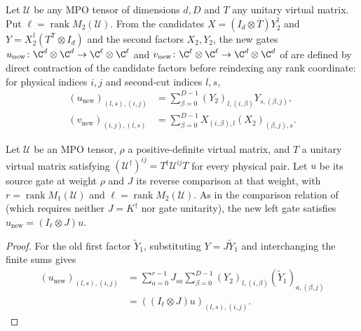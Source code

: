 \begin{definition}
    \label{def:mpug_inverse_compatible_gates}
    \leanok
    Let $\mathcal U$ be any MPO tensor of dimensions $d,D$ and $T$ any
    unitary virtual matrix. Put $\ell=\operatorname{rank}M_2(\mathcal U)$.
    From the candidates $X=(I_d\otimes\overline T)Y_2^\dagger$ and
    $Y=X_2^\dagger(T^{\mathsf T}\otimes I_d)$ and the second factors
    $X_2,Y_2$, the new gates
    $u_{\mathrm{new}}\colon\C^d\otimes\C^d\to\C^\ell\otimes\C^\ell$
    and $v_{\mathrm{new}}\colon\C^\ell\otimes\C^\ell\to\C^d\otimes\C^d$
    of \cite[lines~5486--5487]{FrancoRubio2025MPUGauging} are defined by direct
    contraction of the candidate factors before reindexing any rank coordinate:
    for physical indices $i,j$ and second-cut indices $l,s$,
    \begin{align}
        (u_{\mathrm{new}})_{(l,s),(i,j)}
         & =\sum_{\beta=0}^{D-1}(Y_2)_{l,(i,\beta)}Y_{s,(\beta,j)}, \\
        (v_{\mathrm{new}})_{(i,j),(l,s)}
         & =\sum_{\beta=0}^{D-1}X_{(i,\beta),l}(X_2)_{(\beta,j),s}.
    \end{align}
\end{definition}

\begin{lemma}
    \label{thm:mpug_inverse_new_u_transport}
    \leanok
    Let $\mathcal U$ be an MPO tensor, $\rho$ a positive-definite virtual
    matrix, and $T$ a unitary virtual matrix satisfying
    $(\mathcal U^\dagger)^{ij}=T^\dagger\mathcal U^{ij}T$ for every
    physical pair. Let $u$ be its source gate at weight $\rho$ and $J$
    its reverse comparison at that weight, with
    $r=\operatorname{rank}M_1(\mathcal U)$ and
    $\ell=\operatorname{rank}M_2(\mathcal U)$. As in the comparison relation of
    \cite[lines~5432--5443 and 5486--5487]{FrancoRubio2025MPUGauging} (which
    requires neither $J=K^\dagger$ nor gate unitarity), the new left gate
    satisfies
    $u_{\mathrm{new}}=(I_\ell\otimes J)u$.
\end{lemma}
\begin{proof}\leanok
    For the old first factor $\widetilde Y_1$, substituting
    $Y=J\widetilde Y_1$ and interchanging the finite sums gives
    \begin{align}
        (u_{\mathrm{new}})_{(l,s),(i,j)}
         & =\sum_{a=0}^{r-1}J_{sa}
        \sum_{\beta=0}^{D-1}(Y_2)_{l,(i,\beta)}
        (\widetilde Y_1)_{a,(\beta,j)}          \\
         & =((I_\ell\otimes J)u)_{(l,s),(i,j)}.
    \end{align}
\end{proof}

